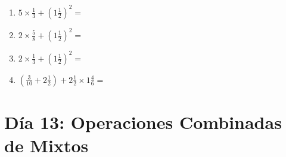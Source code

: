 \documentclass[12pt]{article}
\begin{document}
\begin{enumerate}
\item \large $ 5 \times \frac{1}{3} + (1 \frac{1}{2})^2 = $ \vspace{1.8cm}
\item \large $ 2 \times \frac{5}{8} + (1 \frac{1}{2})^2 = $ \vspace{1.8cm}
\item \large $ 2 \times \frac{1}{3} + (1 \frac{1}{2})^2 = $ \vspace{1.8cm}
\item \large $ (\frac{3}{10} + 2 \frac{1}{2}) + 2 \frac{1}{2} \times 1 \frac{4}{6} = $ \vspace{1.8cm}
\end{enumerate}\newpage
\section*{Día 13: Operaciones Combinadas de Mixtos}
\end{document}
